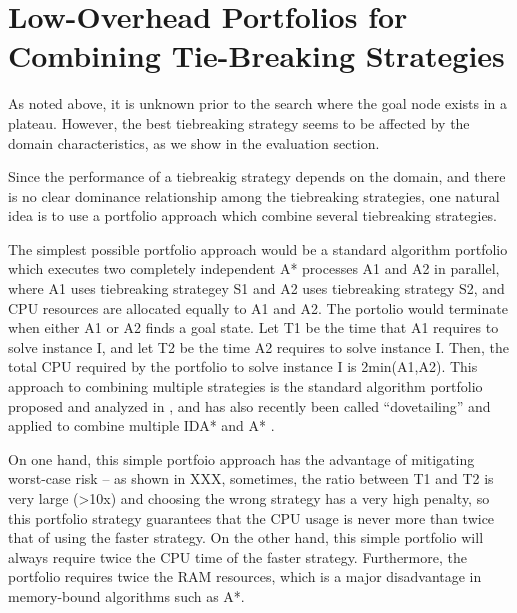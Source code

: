 %  

\section{Low-Overhead Portfolios for Combining Tie-Breaking Strategies}

As noted above, it is unknown prior to the search where the goal node
exists in a plateau.
However, the best tiebreaking strategy seems to be affected by the domain
characteristics, as we show in the evaluation section.

Since the performance of a tiebreakig strategy depends on the domain, and there is no clear dominance relationship among the tiebreaking strategies, one natural 
idea is to use a portfolio approach which combine several tiebreaking strategies.

The simplest possible portfolio approach would be a standard algorithm portfolio
which executes two completely independent A* processes A1 and A2 in parallel, where A1 uses tiebreaking strategey S1 and A2 uses tiebreaking strategy S2, and CPU resources are allocated equally to A1 and A2.
The portolio would terminate when either A1 or A2 finds a goal state.
Let T1 be the time that A1 requires to solve instance I, and let T2 be the time A2 requires to solve instance I. Then, the total CPU required by the portfolio to solve instance I is 2min(A1,A2). This approach to combining multiple strategies is the standard algorithm portfolio proposed and analyzed in \cite{HubermanLH97,GomesS01}, and has also recently been called ``dovetailing'' and applied to combine multiple IDA* and A*  \cite{ValenzanoSSBK10}. %

On one hand, this simple portfoio approach has the advantage of mitigating worst-case risk -- as shown in XXX, sometimes, the ratio between T1 and T2 is very large (>10x) and choosing the wrong strategy has a very high penalty, so this portfolio strategy guarantees that the CPU usage is never more than twice that of using the faster strategy.
On the other hand, this simple portfolio will always require twice the CPU time of the faster strategy. Furthermore, the portfolio requires twice the RAM resources, which is a major disadvantage in memory-bound algorithms such as A*.

